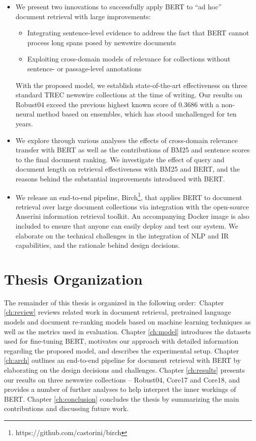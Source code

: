 \begin{itemize}
	\item
	We present two innovations to successfully apply BERT to ``ad hoc'' document retrieval 	with large improvements:\
	\begin{itemize}
		\item Integrating sentence-level evidence to address the fact that BERT cannot process long spans posed by newswire documents
		\item Exploiting cross-domain models of relevance for collections without sentence- or passage-level annotations
	\end{itemize}
	With the proposed model, we establish state-of-the-art effectiveness on three standard TREC newswire collections at the time of writing.
	Our results on Robust04 exceed the previous highest known score of 0.3686 \cite{Cormack:2009:RRF:1571941.1572114} with a non-neural method based on ensembles, which has stood unchallenged for ten years.

	\item
	We explore through various analyses the effects of cross-domain relevance transfer with BERT as well as the contributions of BM25 and sentence scores to the final document ranking.
	We investigate the effect of query and document length on retrieval effectiveness with BM25 and BERT, and the reasons behind the substantial improvements introduced with BERT.

	\item
	We release an end-to-end pipeline, Birch\footnote{https://github.com/castorini/birch}, that applies BERT to document retrieval over large document collections via integration with the open-source Anserini information retrieval toolkit.
	An accompanying Docker image is also included to ensure that anyone can easily deploy and test our system.
	We elaborate on the technical challenges in the integration of NLP and IR capabilities, and the rationale behind design decisions.
\end{itemize}

\section{Thesis Organization}

The remainder of this thesis is organized in the following order:\
Chapter \ref{ch:review} reviews related work in document retrieval, pretrained language models and document re-ranking models based on machine learning techniques as well as the metrics used in evaluation.
Chapter \ref{ch:model} introduces the datasets used for fine-tuning BERT, motivates our approach with detailed information regarding the proposed model, and describes the experimental setup.
Chapter \ref{ch:arch} outlines an end-to-end pipeline for document retrieval with BERT by elaborating on the design decisions and challenges.
Chapter \ref{ch:results} presents our results on three newswire collections -- Robust04, Core17 and Core18, and provides a number of further analyses to help interpret the inner workings of BERT.
Chapter \ref{ch:conclusion} concludes the thesis by summarizing the main contributions and discussing future work.
